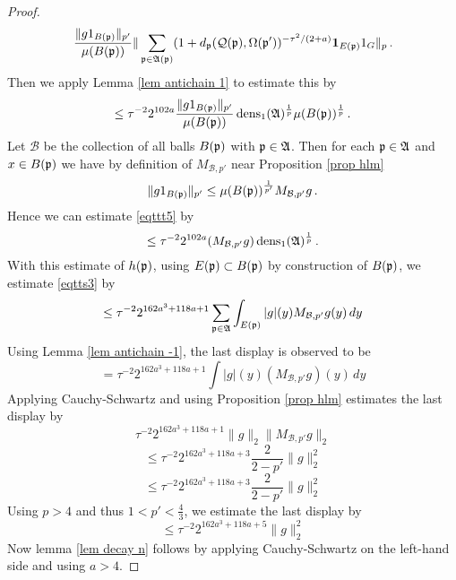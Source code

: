 \begin{proof}
    \begin{equation}
\frac{\|g1_{B(\mathfrak p)}\|_{p'}}{\mu(B(\mathfrak p))}
    \|\sum_{\mathfrak p\in\mathfrak{A}(\mathfrak p)}(1+d_{\mathfrak p}(\mathcal{Q}(\mathfrak p), \Omega(\mathfrak p'))^{-\tau^2/(2+a)}\mathbf{1}_{E(\mathfrak p)}1_G\|_{p}\, .
    \end{equation}
Then we apply Lemma \ref{lem antichain 1} to estimate this by
\begin{equation}\label{eqttt5}
    \le  \tau^{-2}
2^{102a}
    \frac{\|g1_{B(\mathfrak p)}\|_{p'}}{\mu(B(\mathfrak p))}
    \operatorname{\operatorname{dens}}_1(\mathfrak{A})^{\frac 1p}\mu(B(\mathfrak p))^{\frac 1p}\, .
\end{equation}
Let $\mathcal{B}$ be the collection of all balls
$B(\mathfrak p)$ with $\mathfrak p\in \mathfrak{A}$. Then
for each $\mathfrak p\in \mathfrak{A}$ and $x\in B(\mathfrak p)$ we have by
definition of $M_{\mathcal{B},p'}$
near Proposition \ref{prop hlm}
\begin{equation}
\|g1_{B(\mathfrak p)}\|_{p'}\le
\mu(B(\mathfrak p))^{\frac 1{p'}} M_{\mathcal{B},p'}g \, .
\end{equation}
Hence we can estimate \eqref{eqttt5} by
\begin{equation}\label{eqttt5}
    \le  \tau^{-2}
2^{102a}
    (M_{\mathcal{B}, p'}g)
    \operatorname{\operatorname{dens}}_1(\mathfrak{A})^{\frac 1p}\, .
\end{equation}
With this estimate of $h(\mathfrak p)$,
using $E(\mathfrak p)\subset B(\mathfrak p)$ by construction of $B(\mathfrak p)$, we estimate
\eqref{eqtts3} by
    \begin{equation}\label{eqtts4}
    \le  \tau^{-2}2^{162a^3+118a + 1} \sum_{\mathfrak p\in \mathfrak{A}}
    \int_{E(\mathfrak p)}|g|(y)M_{\mathcal{B}, p'}g(y) \, dy
            \end{equation}
Using Lemma \ref{lem antichain -1},
the last display is observed to be
\begin{equation}\label{eqtts4}
=  \tau^{-2}2^{162a^3+118a + 1}
    \int |g|(y)(M_{\mathcal{B}, p'}g)(y) \, dy
            \end{equation}
Applying Cauchy-Schwartz and using Proposition \eqref{prop hlm} estimates the last display by
\begin{equation}
    \tau^{-2}2^{162a^3+118a + 1}
    \|g\|_2 \|M_{\mathcal{B}, p'} g\|_2
            \end{equation}
\begin{equation}
    \le  \tau^{-2}2^{162a^3+118a + 3}\frac{2}{2-p'}
    \|g\|_2 ^2
            \end{equation}
\begin{equation}\le  \tau^{-2}2^{162a^3+118a + 3}\frac{2}{2-p'}
\|g\|_2^2
            \end{equation}
Using $p>4$ and thus $1<p'<\frac 43$, we estimate the last display by
\begin{equation}\le  \tau^{-2}2^{162a^3+118a + 5}
\|g\|_2^2
            \end{equation}
Now lemma \ref{lem decay n} follows by applying Cauchy-Schwartz on the left-hand side and using
    $a>4$.




\end{proof}


